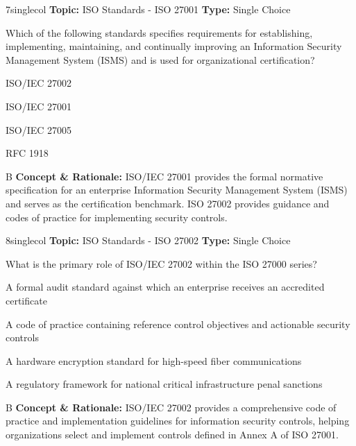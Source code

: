 \begin{qcard}{7}{singlecol}
\textcolor{darkslate!75}{\small\textbf{Topic:} ISO Standards - ISO 27001 \hfill \textbf{Type:} Single Choice}\vspace{0.4em}\par
Which of the following standards specifies requirements for establishing, implementing, maintaining, and continually improving an Information Security Management System (ISMS) and is used for organizational certification?
\begin{qoptions}
\item ISO/IEC 27002
\item ISO/IEC 27001
\item ISO/IEC 27005
\item RFC 1918
\end{qoptions}
\end{qcard}
\nopagebreak
\begin{explainbox}{B}
\textbf{Concept \& Rationale:} ISO/IEC 27001 provides the formal normative specification for an enterprise Information Security Management System (ISMS) and serves as the certification benchmark. ISO 27002 provides guidance and codes of practice for implementing security controls.
\end{explainbox}

\begin{qcard}{8}{singlecol}
\textcolor{darkslate!75}{\small\textbf{Topic:} ISO Standards - ISO 27002 \hfill \textbf{Type:} Single Choice}\vspace{0.4em}\par
What is the primary role of ISO/IEC 27002 within the ISO 27000 series?
\begin{qoptions}
\item A formal audit standard against which an enterprise receives an accredited certificate
\item A code of practice containing reference control objectives and actionable security controls
\item A hardware encryption standard for high-speed fiber communications
\item A regulatory framework for national critical infrastructure penal sanctions
\end{qoptions}
\end{qcard}
\nopagebreak
\begin{explainbox}{B}
\textbf{Concept \& Rationale:} ISO/IEC 27002 provides a comprehensive code of practice and implementation guidelines for information security controls, helping organizations select and implement controls defined in Annex A of ISO 27001.
\end{explainbox}


